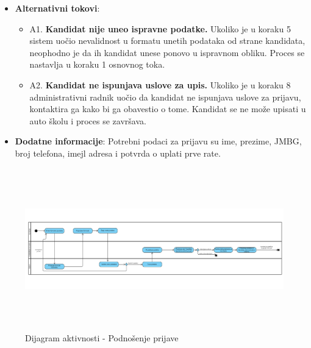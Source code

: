 \begin{itemize}
  \item \textbf{Alternativni tokovi}:
      \begin{itemize}
        \item A1. \textbf{Kandidat nije uneo ispravne podatke.}
        Ukoliko je u koraku 5 sistem uočio nevalidnost u formatu unetih podataka od strane kandidata, neophodno je da ih kandidat unese ponovo u ispravnom obliku.
        Proces se nastavlja u koraku 1 osnovnog toka.
        \item A2. \textbf{Kandidat ne ispunjava uslove za upis.}
        Ukoliko je u koraku 8 administrativni radnik uočio da kandidat ne ispunjava uslove za prijavu, kontaktira ga kako bi ga obavestio o tome.
        Kandidat se ne može upisati u auto školu i proces se završava.
      \end{itemize}

  \item \textbf{Dodatne informacije}:\newline
  Potrebni podaci za prijavu su ime, prezime, JMBG, broj telefona, imejl adresa i potvrda o uplati prve rate.
\end{itemize}

\begin{figure}[H]
  \begin{center}
      \includegraphics[width=140mm, height=70mm]{Diagrams/dijagram_aktivnosti_podnosenje_prijave.png}
  \end{center}
  \caption {Dijagram aktivnosti - Podnošenje prijave}
  \label{activity_podnosenje_prijave}

\end{figure}



